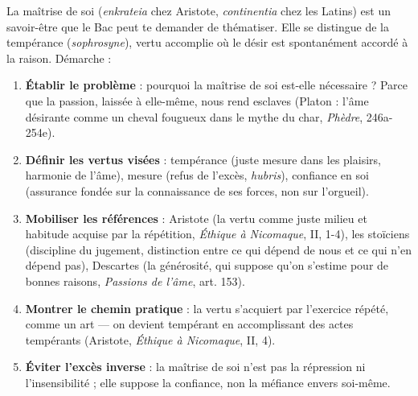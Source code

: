 \documentclass[11pt]{article}
\newcommand{\cle}[1]{{\popxbold\color{popdark}#1}}
\begin{document}
\begin{methode}
La maîtrise de soi (\emph{enkrateia} chez Aristote, \emph{continentia} chez les Latins) est un savoir-être que le Bac peut te demander de thématiser. Elle se distingue de la \cle{tempérance} (\emph{sophrosyne}), vertu accomplie où le désir est spontanément accordé à la raison. Démarche :
\begin{enumerate}
\item \textbf{Établir le problème} : pourquoi la maîtrise de soi est-elle nécessaire ? Parce que la passion, laissée à elle-même, nous rend esclaves (Platon : l'âme désirante comme un cheval fougueux dans le mythe du char, \emph{Phèdre}, 246a-254e).
\item \textbf{Définir les vertus visées} : tempérance (juste mesure dans les plaisirs, harmonie de l'âme), mesure (refus de l'excès, \emph{hubris}), confiance en soi (assurance fondée sur la connaissance de ses forces, non sur l'orgueil).
\item \textbf{Mobiliser les références} : Aristote (la vertu comme juste milieu et habitude acquise par la répétition, \emph{Éthique à Nicomaque}, II, 1-4), les stoïciens (discipline du jugement, distinction entre ce qui dépend de nous et ce qui n'en dépend pas), Descartes (la générosité, qui suppose qu'on s'estime pour de bonnes raisons, \emph{Passions de l'âme}, art. 153).
\item \textbf{Montrer le chemin pratique} : la vertu s'acquiert par l'exercice répété, comme un art — on devient tempérant en accomplissant des actes tempérants (Aristote, \emph{Éthique à Nicomaque}, II, 4).
\item \textbf{Éviter l'excès inverse} : la maîtrise de soi n'est pas la répression ni l'insensibilité ; elle suppose la confiance, non la méfiance envers soi-même.
\end{enumerate}
\end{methode}
\end{document}
